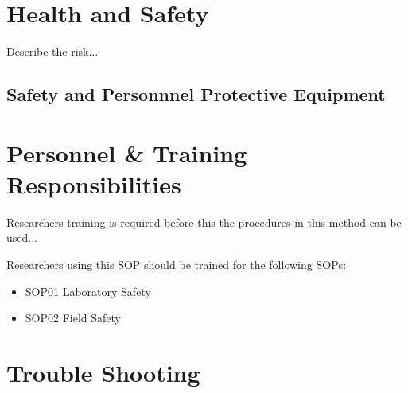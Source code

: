 \documentclass[12pt]{../SOP3_beta}\usepackage[]{graphicx}\usepackage[]{color}
\begin{document}
\section{Health and Safety}

\NP Describe the risk...


\subsection{Safety and Personnnel Protective Equipment}


\section{Personnel \& Training Responsibilities}

\NP Researchers training is required before this the procedures in this method can be used... 

\NP Researchers using this SOP should be trained for the following SOPs:

\begin{itemize}
  \item SOP01 Laboratory Safety
  \item SOP02 Field Safety
\end{itemize}

\section{Trouble Shooting}
\end{document}
